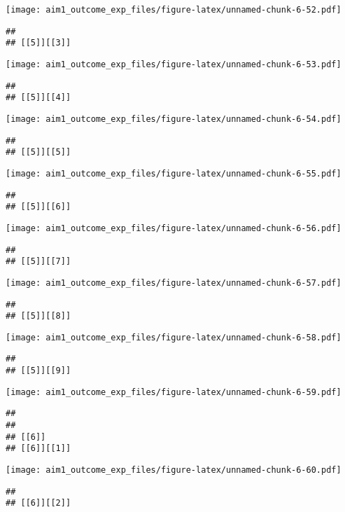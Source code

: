 \documentclass[
]{article}
\begin{document}
\texttt{[image: aim1\_outcome\_exp\_files/figure-latex/unnamed-chunk-6-52.pdf]}

\begin{verbatim}
## 
## [[5]][[3]]
\end{verbatim}

\texttt{[image: aim1\_outcome\_exp\_files/figure-latex/unnamed-chunk-6-53.pdf]}

\begin{verbatim}
## 
## [[5]][[4]]
\end{verbatim}

\texttt{[image: aim1\_outcome\_exp\_files/figure-latex/unnamed-chunk-6-54.pdf]}

\begin{verbatim}
## 
## [[5]][[5]]
\end{verbatim}

\texttt{[image: aim1\_outcome\_exp\_files/figure-latex/unnamed-chunk-6-55.pdf]}

\begin{verbatim}
## 
## [[5]][[6]]
\end{verbatim}

\texttt{[image: aim1\_outcome\_exp\_files/figure-latex/unnamed-chunk-6-56.pdf]}

\begin{verbatim}
## 
## [[5]][[7]]
\end{verbatim}

\texttt{[image: aim1\_outcome\_exp\_files/figure-latex/unnamed-chunk-6-57.pdf]}

\begin{verbatim}
## 
## [[5]][[8]]
\end{verbatim}

\texttt{[image: aim1\_outcome\_exp\_files/figure-latex/unnamed-chunk-6-58.pdf]}

\begin{verbatim}
## 
## [[5]][[9]]
\end{verbatim}

\texttt{[image: aim1\_outcome\_exp\_files/figure-latex/unnamed-chunk-6-59.pdf]}

\begin{verbatim}
## 
## 
## [[6]]
## [[6]][[1]]
\end{verbatim}

\texttt{[image: aim1\_outcome\_exp\_files/figure-latex/unnamed-chunk-6-60.pdf]}

\begin{verbatim}
## 
## [[6]][[2]]
\end{verbatim}
\end{document}

